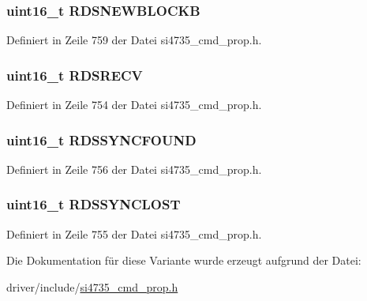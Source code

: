 \subsubsection[{R\+D\+S\+N\+E\+W\+B\+L\+O\+C\+K\+B}]{\setlength{\rightskip}{0pt plus 5cm}uint16\+\_\+t R\+D\+S\+N\+E\+W\+B\+L\+O\+C\+K\+B}\label{unionfm__rds__int__source_ae17ab7ac1a00946b1d73b05899a30202}


Definiert in Zeile 759 der Datei si4735\+\_\+cmd\+\_\+prop.\+h.

\hypertarget{unionfm__rds__int__source_af44cb84a104f9c29f31b0ac4bd89a601}{}
\subsubsection[{R\+D\+S\+R\+E\+C\+V}]{\setlength{\rightskip}{0pt plus 5cm}uint16\+\_\+t R\+D\+S\+R\+E\+C\+V}\label{unionfm__rds__int__source_af44cb84a104f9c29f31b0ac4bd89a601}


Definiert in Zeile 754 der Datei si4735\+\_\+cmd\+\_\+prop.\+h.

\hypertarget{unionfm__rds__int__source_a2cc7666ab88379a96c9b09cc3dec22cb}{}
\subsubsection[{R\+D\+S\+S\+Y\+N\+C\+F\+O\+U\+N\+D}]{\setlength{\rightskip}{0pt plus 5cm}uint16\+\_\+t R\+D\+S\+S\+Y\+N\+C\+F\+O\+U\+N\+D}\label{unionfm__rds__int__source_a2cc7666ab88379a96c9b09cc3dec22cb}


Definiert in Zeile 756 der Datei si4735\+\_\+cmd\+\_\+prop.\+h.

\hypertarget{unionfm__rds__int__source_aeca7437db524c8748f4ccd800033970d}{}
\subsubsection[{R\+D\+S\+S\+Y\+N\+C\+L\+O\+S\+T}]{\setlength{\rightskip}{0pt plus 5cm}uint16\+\_\+t R\+D\+S\+S\+Y\+N\+C\+L\+O\+S\+T}\label{unionfm__rds__int__source_aeca7437db524c8748f4ccd800033970d}


Definiert in Zeile 755 der Datei si4735\+\_\+cmd\+\_\+prop.\+h.



Die Dokumentation für diese Variante wurde erzeugt aufgrund der Datei\+:\begin{DoxyCompactItemize}
\item 
driver/include/\hyperlink{si4735__cmd__prop_8h}{si4735\+\_\+cmd\+\_\+prop.\+h}\end{DoxyCompactItemize}
